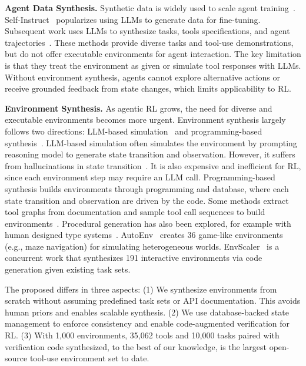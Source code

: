 \documentclass{article}
\theoremstyle{plain}
\theoremstyle{definition}
\theoremstyle{remark}
\newcommand{\synth}{\textls{\textsc{AWM}}\xspace}
\newcommand{\myparagraph}[1]{\noindent\textbf{#1}}
\begin{document}
\myparagraph{Agent Data Synthesis.}
Synthetic data is widely used to scale agent training~\citep{patil2024gorilla,schick2023toolformer,qin2024toolllm,liu2024apigen,toolace}.
Self-Instruct~\citep{selfinstruct} popularizes using LLMs to generate data for fine-tuning.
Subsequent work uses LLMs to synthesize tasks, tools specifications, and agent trajectories~\citep{agentsynth,xu2024agenttrek,li2025websailor,song-etal-2024-agentbank,liu2024apigen,toolace,wang2026adapting,apigen-mt}.
These methods provide diverse tasks and tool-use demonstrations, but do not offer executable environments for agent interaction.
The key limitation is that they treat the environment as given or simulate tool responses with LLMs.
Without environment synthesis, agents cannot explore alternative actions or receive grounded feedback from state changes, which limits applicability to RL.


\myparagraph{Environment Synthesis.}
As agentic RL grows, the need for diverse and executable environments becomes more urgent.
Environment synthesis largely follows two directions: LLM-based simulation~\citep{wang-etal-2024-language,li2025wordworldlargelanguage,chen2025scalingagentlearningexperience,li2025simulatingenvironmentsreasoningmodels} and programming-based synthesis~\citep{tang2024worldcoder,sullivan-etal-2025-procedural,autoforge,autoenv,envscaler}.
LLM-based simulation often simulates the environment by prompting reasoning model to generate state transition and observation. However, it suffers from hallucinations in state transition~\citep{kalai2025languagemodelshallucinate,wang-etal-2024-language}. It is also expensive and inefficient for RL, since each environment step may require an LLM call.
Programming-based synthesis builds environments through programming and database, where each state transition and observation are driven by the code.
Some methods extract tool graphs from documentation and sample tool call sequences to build environments~\citep{tongyi-environment,autoforge}.
Procedural generation has also been explored, for example with human designed type systems~\citep{sullivan-etal-2025-procedural}.
AutoEnv~\citep{autoenv} creates 36 game-like environments (e.g., maze navigation) for simulating heterogeneous worlds. 
EnvScaler~\citep{envscaler} is a concurrent work that synthesizes 191 interactive environments via code generation given existing task sets.

The proposed \synth differs in three aspects:
(1) We synthesize environments from scratch without assuming predefined task sets or API documentation. This avoids human priors and enables scalable synthesis.
(2) We use database-backed state management to enforce consistency and enable code-augmented verification for RL.
(3) With 1,000 environments, 35,062 tools and 10,000 tasks paired with verification code synthesized, to the best of our knowledge, \synth is the largest open-source tool-use environment set to date.
\end{document}
